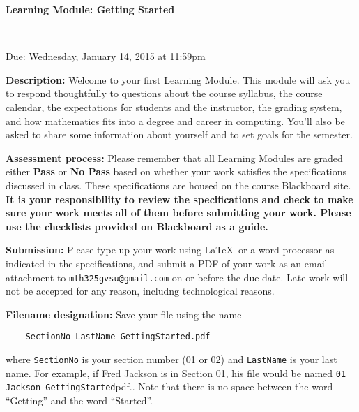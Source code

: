 \documentclass[11pt,letterpaper]{article}
\begin{document}
\begin{center}
	\begin{Large}
		\textbf{Learning Module: Getting Started} 
	\end{Large} \\
	\begin{large}
		Due: Wednesday, January 14, 2015 at 11:59pm 
	\end{large}
\end{center}

\textbf{Description:} Welcome to your first Learning Module. This module will ask you to respond thoughtfully to questions about the course syllabus, the course calendar, the expectations for students and the instructor, the grading system, and how mathematics fits into a degree and career in computing. You'll also be asked to share some information about yourself and to set goals for the semester. 

\smallskip




\smallskip

\textbf{Assessment process:} Please remember that all Learning Modules are graded either \textbf{Pass} or \textbf{No Pass} based on whether your work satisfies the specifications discussed in class. These specifications are housed on the course Blackboard site. \textbf{It is your responsibility to review the specifications and check to make sure your work meets all of them before submitting your work. Please use the checklists provided on Blackboard as a guide.} 

\smallskip

\textbf{Submission:} Please type up your work using \LaTeX \, or a word processor as indicated in the specifications, and submit a PDF of your work as an email attachment to \texttt{mth325gvsu@gmail.com} on or before the due date. Late work will not be accepted for any reason, includng technological reasons. 

\smallskip

\textbf{Filename designation:} Save your file using the name
\begin{verbatim}
	SectionNo LastName GettingStarted.pdf
\end{verbatim}
where \verb.SectionNo. is your section number (01 or 02) and \verb.LastName. is your last name. For example, if Fred Jackson is in Section 01, his file would be named \verb.01 Jackson GettingStarted.pdf.. Note that there is no space between the word ``Getting'' and the word ``Started''. 
\end{document}
